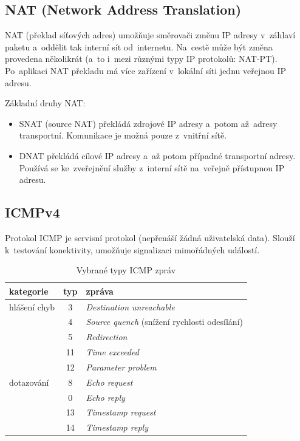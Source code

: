 \subsection{NAT (Network Address Translation)}

NAT (překlad síťových adres) umožňuje směrovači změnu IP adresy v~záhlaví paketu a~oddělit tak interní sít od~internetu. Na~cestě může být změna provedena několikrát (a~to i~mezi různými typy IP protokolů: NAT-PT). Po~aplikaci NAT překladu má více zařízení v~lokální síti jednu veřejnou IP adresu.

Základní druhy NAT:
\begin{itemize}
    \item SNAT (source NAT) překládá zdrojové IP adresy a~potom až~adresy transportní. Komunikace je možná pouze z~vnitřní sítě.
    \item DNAT překládá cílové IP adresy a~až potom případné transportní adresy. Používá se ke~zveřejnění služby z~interní sítě na~veřejně přístupnou IP adresu.
\end{itemize}

\subsection{ICMPv4}

Protokol ICMP je servisní protokol (nepřenáší žádná uživatelská data). Slouží k~testování konektivity, umožňuje signalizaci mimořádných událostí.

\begin{table}[ht]
	\centering
	\caption{Vybrané typy ICMP zpráv}
	\begin{tabular}{|l|c|l|}
		\hline
		kategorie    & typ & zpráva \\\hline\hline
		hlášení chyb & 3   & \emph{Destination unreachable} \\
		             & 4   & \emph{Source quench} (snížení rychlosti odesílání) \\
		             & 5   & \emph{Redirection} \\
		             & 11  & \emph{Time exceeded} \\
		             & 12  & \emph{Parameter problem} \\
		\hline
		dotazování   & 8   & \emph{Echo request} \\
		             & 0   & \emph{Echo reply} \\
		             & 13  & \emph{Timestamp request} \\
		             & 14  & \emph{Timestamp reply} \\
		\hline
	\end{tabular}
\end{table}

